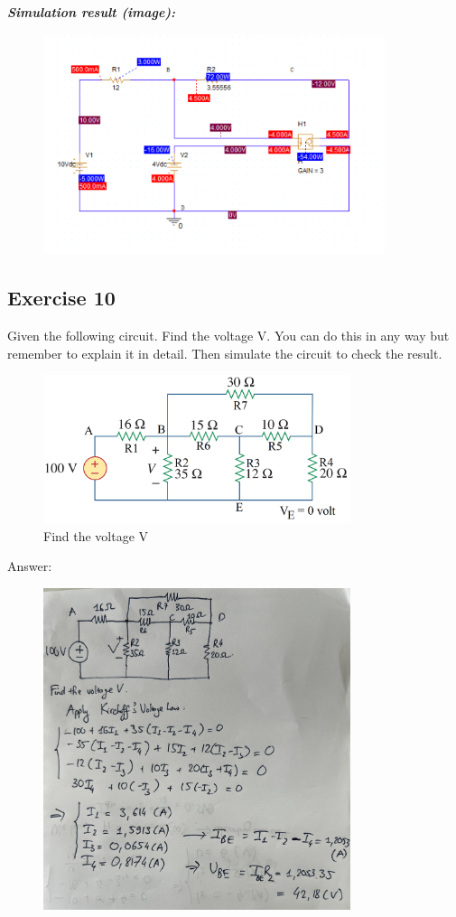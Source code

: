 \textit{\textbf{Simulation result (image):}}
\begin{figure}[H]
    \centering
    \includegraphics[width = 10cm]{source/picture/bai_1/ex9_sim.png}
\end{figure}
\newpage

\subsection{Exercise 10}
Given the following circuit. Find the voltage V. You can do this in any way but remember to explain it in detail. Then simulate the circuit to check the result.

\begin{figure}[H]
    \centering
    \includegraphics[width=9cm]{source/picture/bai_1/lab1_ex10_de.png}
    \caption{Find the voltage V}
    \label{lab1_ex10_de}
\end{figure}
Answer:
\begin{figure}[H]
    \centering
    \includegraphics[width=9cm]{source/picture/bai_1/ex10_calculation.jpg}
\end{figure}

